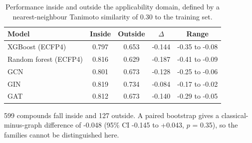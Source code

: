\begin{table}[htbp]
\centering
\caption{Performance inside and outside the applicability domain, defined by a nearest-neighbour Tanimoto similarity of 0.30 to the training set.}
\label{tab:ad}
\small
\setlength{\tabcolsep}{4pt}
\begin{tabular}{lcccc}
\toprule
Model & Inside & Outside & $\Delta$ & Range \\
\midrule
XGBoost (ECFP4) & 0.797 & 0.653 & -0.144 & -0.35 to -0.08 \\
Random forest (ECFP4) & 0.816 & 0.629 & -0.187 & -0.41 to -0.09 \\
GCN & 0.801 & 0.673 & -0.128 & -0.25 to -0.06 \\
GIN & 0.819 & 0.734 & -0.084 & -0.17 to -0.02 \\
GAT & 0.812 & 0.673 & -0.140 & -0.29 to -0.05 \\
\bottomrule
\end{tabular}
\begin{flushleft}\footnotesize 599 compounds fall inside and 127 outside. A paired bootstrap gives a classical-minus-graph difference of -0.048 (95\% CI -0.145 to +0.043, $p$ = 0.35), so the families cannot be distinguished here.\end{flushleft}
\end{table}
